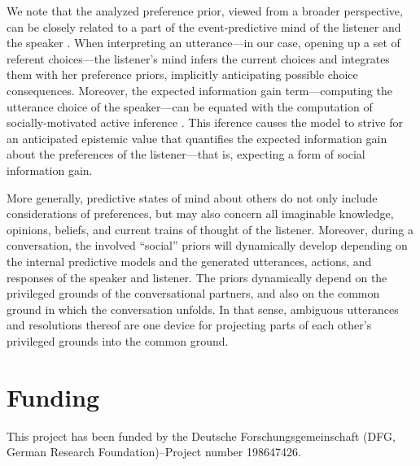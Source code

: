 \documentclass[11pt,a4paper]{article}
\begin{document}
We note that the analyzed preference prior, viewed from a broader perspective, can be closely related to a part of the event-predictive mind of the listener and the speaker \cite{Butz:2016,Butz:2017}. 
When interpreting an utterance---in our case, opening up a set of referent choices---the listener's mind infers the current choices and integrates them with her preference priors, implicitly anticipating possible choice consequences.
Moreover, the expected information gain term---computing the utterance choice of the speaker---can be equated with the computation of socially-motivated active inference \cite{Butz:2017a,Friston:2015}.
This iference causes the model to strive for an anticipated epistemic value that quantifies the expected information gain about the preferences of the listener---that is, expecting a form of social information gain. 


More generally, predictive states of mind about others do not only include considerations of preferences, but may also concern all imaginable knowledge, opinions, beliefs, and current trains of thought of the listener.
Moreover, during a conversation, the involved ``social'' priors will dynamically develop depending on the internal predictive models and the generated utterances, actions, and responses of the speaker and listener. 
The priors dynamically depend on the privileged grounds of the conversational partners, and also on the common ground in which the conversation unfolds.
In that sense, ambiguous utterances and resolutions thereof are one device for projecting parts of each other's privileged grounds into the common ground. 







\section*{Funding}

This project has been funded by the Deutsche Forschungsgemeinschaft (DFG, German Research Foundation)--Project number 198647426. 
\end{document}
